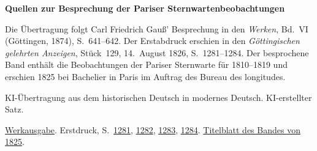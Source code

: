 \clearpage\thispagestyle{empty}
\begin{center}\Large\bfseries Quellen zur Besprechung der Pariser Sternwartenbeobachtungen\end{center}

Die Übertragung folgt Carl Friedrich Gauß’ Besprechung in den \emph{Werken}, Bd.~VI (Göttingen, 1874), S.~641--642. Der Erstabdruck erschien in den \emph{Göttingischen gelehrten Anzeigen}, Stück~129, 14.~August 1826, S.~1281--1284. Der besprochene Band enthält die Beobachtungen der Pariser Sternwarte für 1810--1819 und erschien 1825 bei Bachelier in Paris im Auftrag des Bureau des longitudes.

KI-Übertragung aus dem historischen Deutsch in modernes Deutsch. KI-erstellter Satz.

\href{https://gdz.sub.uni-goettingen.de/id/PPN236007467}{Werkausgabe}. Erstdruck, S.~\href{https://images.p.sub.uni-goettingen.de/iiif/image/gdz:PPN385030444_1826_2:00000603/full/1650,/0/default.jpg}{1281}, \href{https://images.p.sub.uni-goettingen.de/iiif/image/gdz:PPN385030444_1826_2:00000604/full/1650,/0/default.jpg}{1282}, \href{https://images.p.sub.uni-goettingen.de/iiif/image/gdz:PPN385030444_1826_2:00000605/full/1650,/0/default.jpg}{1283}, \href{https://images.p.sub.uni-goettingen.de/iiif/image/gdz:PPN385030444_1826_2:00000606/full/1650,/0/default.jpg}{1284}. \href{https://books.google.nl/books?id=7G5YAAAAcAAJ&pg=PR3}{Titelblatt des Bandes von 1825}.

\clearpage
